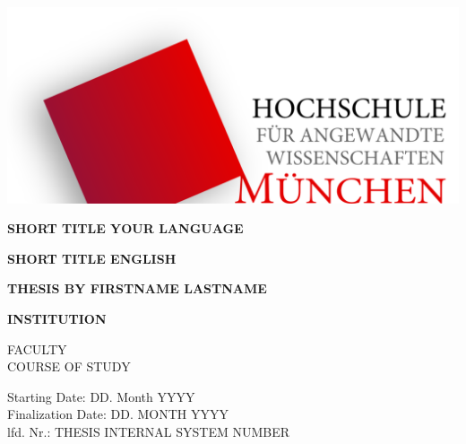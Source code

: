 \documentclass{../Main/main.tex}{subfiles}
\begin{document}
\begin{center}
	\vspace{1cm}

	\includegraphics[width=\textwidth]{../resources/HochschuleMuenchenLogo-1200x521.png}

	\vspace{0.8cm}
	\textbf{SHORT TITLE YOUR LANGUAGE}

	\vspace{0.8cm}
	\textbf{SHORT TITLE ENGLISH}

	\vspace{0.8cm}
	\textbf{THESIS BY FIRSTNAME LASTNAME}

	\vspace{3cm}

	\vfill
	\textbf{INSTITUTION}

	FACULTY\\
	COURSE OF STUDY
	\vspace{1.5cm}

	Starting Date: DD. Month YYYY\\
	Finalization Date: DD. MONTH YYYY\\
	lfd. Nr.: THESIS INTERNAL SYSTEM NUMBER\\

\end{center}

\clearpage
\end{document}

